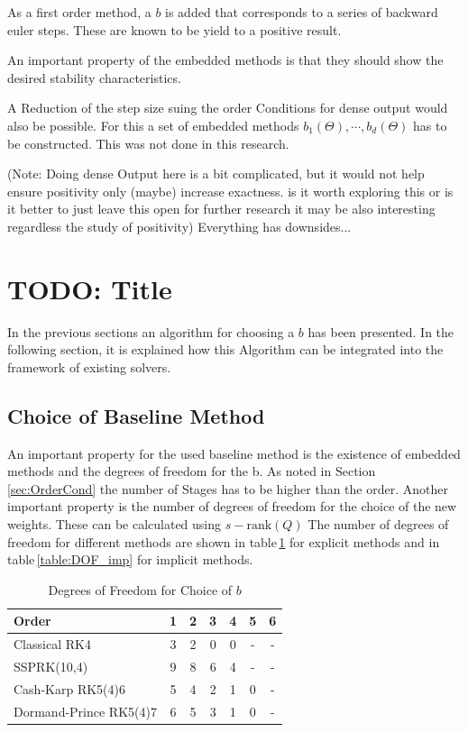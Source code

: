 \documentclass{article}
\begin{document}
As a first order method, a $b$ is added that corresponds to a series of backward euler steps. These are known to be yield to a positive result.

An important property of the embedded methods is that they should show the desired stability characteristics.

A Reduction of the step size suing the order Conditions for dense output would also be possible. For this a set of embedded methods $b_1(\Theta),\cdots,b_d(\Theta)$ has to be constructed. This was not done in this research.

(Note: Doing dense Output here is a bit complicated, but it would not help ensure positivity only (maybe) increase exactness.  is it worth exploring this or is it better to just leave this open for further research it may be also interesting regardless the study of positivity)
Everything has downsides...
 
\section{TODO: Title} \label{sec:integration}

In the previous sections an algorithm for choosing a $b$ has been presented. 
In the following section, it is explained how this Algorithm can be integrated into the framework of existing solvers.

\subsection{Choice of Baseline Method}
An important property for the used baseline method is the existence of embedded methods and the degrees of freedom for the b.
As noted in Section\,\ref{sec:OrderCond} the number of Stages has to be higher than the order. 
Another important property is the number of degrees of freedom for the choice of the new weights. 
These can be calculated using $s-\mathrm{rank}(Q)$%
The number of degrees of freedom for different methods are shown in table\,\ref{table:DOF_exp} for explicit methods and in table\,\ref{table:DOF_imp} for implicit methods.

\begin{table}[h!]
\centering    %
\begin{tabular}{|l |c c c c c c |} 
 \hline 
Order &1&2&3&4&5&6 \\ 
 \hline Classical RK4&3&2&0&0& - & -  \\ 
 SSPRK(10,4)&9&8&6&4& - & -  \\ 
 Cash-Karp RK5(4)6&5&4&2&1&0& -  \\ 
 Dormand-Prince RK5(4)7&6&5&3&1&0& -  \\ 
 \hline 
 \end{tabular}
 \caption{Degrees of Freedom for Choice of $b$} %
 \label{table:DOF_exp}
 \end{table}
 
\end{document}
